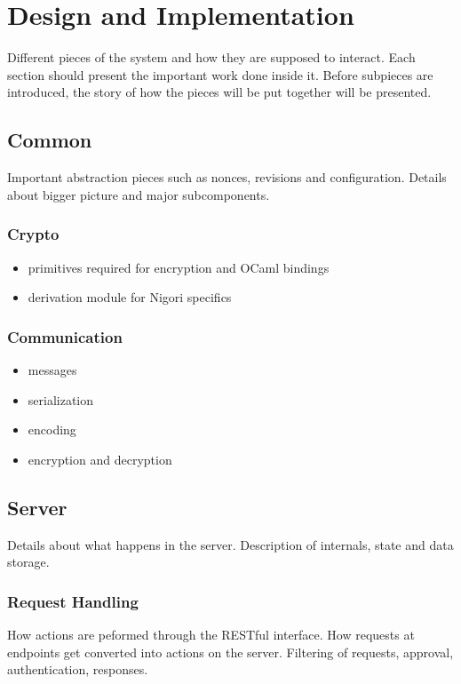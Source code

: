 \chapter{Design and Implementation}
Different pieces of the system and how they are supposed to interact.
Each section should present the important work done inside it.
Before subpieces are introduced, the story of how the pieces will be put together will be presented.

\section{Common}
Important abstraction pieces such as nonces, revisions and configuration.
Details about bigger picture and major subcomponents.

\subsection{Crypto}
\begin{itemize}
  \item primitives required for encryption and OCaml bindings
  \item derivation module for Nigori specifics
\end{itemize}

\subsection{Communication}
\begin{itemize}
  \item messages
  \item serialization
  \item encoding
  \item encryption and decryption
\end{itemize}

\section{Server}
Details about what happens in the server.
Description of internals, state and data storage.

\subsection{Request Handling}
How actions are peformed through the RESTful interface.
How requests at endpoints get converted into actions on the server.
Filtering of requests, approval, authentication, responses.

